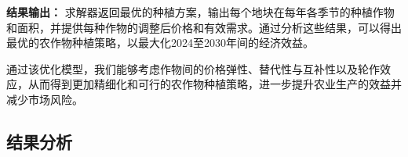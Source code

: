 \textbf{结果输出：}  
求解器返回最优的种植方案，输出每个地块在每年各季节的种植作物和面积，并提供每种作物的调整后价格和有效需求。通过分析这些结果，可以得出最优的农作物种植策略，以最大化2024至2030年间的经济效益。

通过该优化模型，我们能够考虑作物间的价格弹性、替代性与互补性以及轮作效应，从而得到更加精细化和可行的农作物种植策略，进一步提升农业生产的效益并减少市场风险。


\subsection[\hspace{-2pt}结果分析]{{\heiti{}\hspace{-8pt}结果分析}}\label{subsec:3-model-build}



